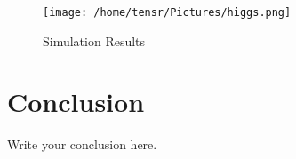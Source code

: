 \documentclass{article}[12pt]
\begin{document}
\begin{figure}
    \centering
    \texttt{[image: /home/tensr/Pictures/higgs.png]}
    \caption{Simulation Results}
    \label{simulationfigure}
\end{figure}

\section{Conclusion}
Write your conclusion here.
\end{document}

